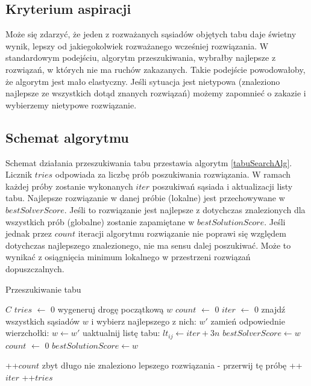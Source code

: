 \documentclass[11pt,a4paper,twoside]{article}
\begin{document}
\subsection{Kryterium aspiracji}
Może się zdarzyć, że jeden z rozważanych sąsiadów objętych tabu daje świetny wynik, lepszy od jakiegokolwiek rozważanego wcześniej rozwiązania. W standardowym podejściu, algorytm przeszukiwania, wybrałby najlepsze z rozwiązań, w których nie ma ruchów zakazanych. Takie podejście powodowałoby, że algorytm jest mało elastyczny. Jeśli sytuacja jest nietypowa (znaleziono najlepsze ze wszystkich dotąd znanych rozwiązań) możemy zapomnieć o zakazie i wybierzemy nietypowe rozwiązanie. 

\subsection{Schemat algorytmu}
Schemat działania przeszukiwania tabu przestawia algorytm \ref{tabuSearchAlg}. Licznik $tries$ odpowiada za liczbę prób poszukiwania rozwiązania. W ramach każdej próby zostanie wykonanych $iter$ poszukiwań sąsiada i aktualizacji listy tabu. Najlepsze rozwiązanie w danej próbie (lokalne) jest przechowywane w $bestSolverScore$. Jeśli to rozwiązanie jest najlepsze z dotychczas znalezionych dla wszystkich prób (globalne) zostanie zapamiętane w $bestSolutionScore$. Jeśli jednak przez $count$ iteracji algorytmu rozwiązanie nie poprawi się względem dotychczas najlepszego znalezionego, nie ma sensu dalej poszukiwać. Może to wynikać z osiągnięcia minimum lokalnego w przestrzeni rozwiązań dopuszczalnych.

\begin{algorithm}[ht]
\caption{Przeszukiwanie tabu}
\label{tabuSearchAlg}
\begin{algorithmic}%
\Require $C$
	\State $tries$ $\leftarrow$ 0
		\State wygeneruj drogę początkową $w$
		\State $count$ $\leftarrow$ 0
		\State $iter$ $\leftarrow$ 0
			\State znajdź wszystkich sąsiadów $w$ i wybierz najlepszego z nich: $w'$
			\State zamień odpowiednie wierzchołki: $w \leftarrow w'$ 
			\State uaktualnij listę tabu: $lt_{ij} \leftarrow iter + 3n$
				\State $bestSolverScore \leftarrow w$
				\State $count$ $\leftarrow$ 0
					\State $bestSolutionScore \leftarrow w$
					
    			\EndIf
    		
    		\Else
    			\State ++$count$
    		\EndIf
    			\State zbyt długo nie znaleziono lepszego rozwiązania - przerwij tę próbę
    		\EndIf
    	\State ++$iter$
		\EndWhile
		\State ++$tries$
	\EndWhile
\end{algorithmic}
\end{algorithm}
\end{document}
